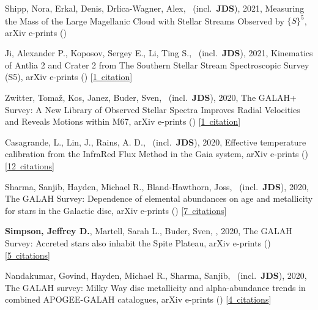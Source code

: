 \item[{\color{numcolor}\scriptsize9}] Shipp, Nora, Erkal, Denis, Drlica-Wagner, Alex, \etal\ (incl.\ \textbf{JDS}), 2021, Measuring the Mass of the Large Magellanic Cloud with Stellar Streams Observed by ${\{}S{\}}^5$, arXiv e-prints ()

\item[{\color{numcolor}\scriptsize8}] Ji, Alexander P., Koposov, Sergey E., Li, Ting S., \etal\ (incl.\ \textbf{JDS}), 2021, Kinematics of Antlia 2 and Crater 2 from The Southern Stellar Stream Spectroscopic Survey (S5), arXiv e-prints () [\href{https://ui.adsabs.harvard.edu/#abs/2021arXiv210612656J}{1~citation}]

\item[{\color{numcolor}\scriptsize7}] Zwitter, Toma{\v{z}}, Kos, Janez, Buder, Sven, \etal\ (incl.\ \textbf{JDS}), 2020, The GALAH+ Survey: A New Library of Observed Stellar Spectra Improves Radial Velocities and Reveals Motions within M67, arXiv e-prints () [\href{https://ui.adsabs.harvard.edu/#abs/2020arXiv201212201Z}{1~citation}]

\item[{\color{numcolor}\scriptsize6}] Casagrande, L., Lin, J., Rains, A. D., \etal\ (incl.\ \textbf{JDS}), 2020, Effective temperature calibration from the InfraRed Flux Method in the Gaia system, arXiv e-prints () [\href{https://ui.adsabs.harvard.edu/#abs/2020arXiv201102517C}{12~citations}]

\item[{\color{numcolor}\scriptsize5}] Sharma, Sanjib, Hayden, Michael R., Bland-Hawthorn, Joss, \etal\ (incl.\ \textbf{JDS}), 2020, The GALAH Survey: Dependence of elemental abundances on age and metallicity for stars in the Galactic disc, arXiv e-prints () [\href{https://ui.adsabs.harvard.edu/#abs/2020arXiv201113818S}{7~citations}]

\item[{\color{numcolor}\scriptsize4}] \textbf{Simpson, Jeffrey D.}, Martell, Sarah L., Buder, Sven, \etal, 2020, The GALAH Survey: Accreted stars also inhabit the Spite Plateau, arXiv e-prints () [\href{https://ui.adsabs.harvard.edu/#abs/2020arXiv201102659S}{5~citations}]

\item[{\color{numcolor}\scriptsize3}] Nandakumar, Govind, Hayden, Michael R., Sharma, Sanjib, \etal\ (incl.\ \textbf{JDS}), 2020, The GALAH survey: Milky Way disc metallicity and alpha-abundance trends in combined APOGEE-GALAH catalogues, arXiv e-prints () [\href{https://ui.adsabs.harvard.edu/#abs/2020arXiv201102783N}{4~citations}]

